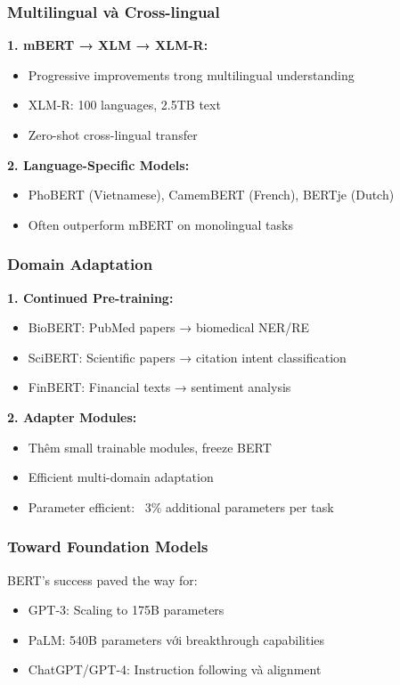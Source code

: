 \subsubsection{Multilingual và Cross-lingual}

\textbf{1. mBERT → XLM → XLM-R:}
\begin{itemize}
    \item Progressive improvements trong multilingual understanding
    \item XLM-R: 100 languages, 2.5TB text
    \item Zero-shot cross-lingual transfer
\end{itemize}

\textbf{2. Language-Specific Models:}
\begin{itemize}
    \item PhoBERT (Vietnamese), CamemBERT (French), BERTje (Dutch)
    \item Often outperform mBERT on monolingual tasks
\end{itemize}

\subsubsection{Domain Adaptation}

\textbf{1. Continued Pre-training:}
\begin{itemize}
    \item BioBERT: PubMed papers → biomedical NER/RE
    \item SciBERT: Scientific papers → citation intent classification
    \item FinBERT: Financial texts → sentiment analysis
\end{itemize}

\textbf{2. Adapter Modules:}
\begin{itemize}
    \item Thêm small trainable modules, freeze BERT
    \item Efficient multi-domain adaptation
    \item Parameter efficient: ~3\% additional parameters per task
\end{itemize}

\subsubsection{Toward Foundation Models}
BERT's success paved the way for:
\begin{itemize}
    \item GPT-3: Scaling to 175B parameters
    \item PaLM: 540B parameters với breakthrough capabilities
    \item ChatGPT/GPT-4: Instruction following và alignment
\end{itemize}

